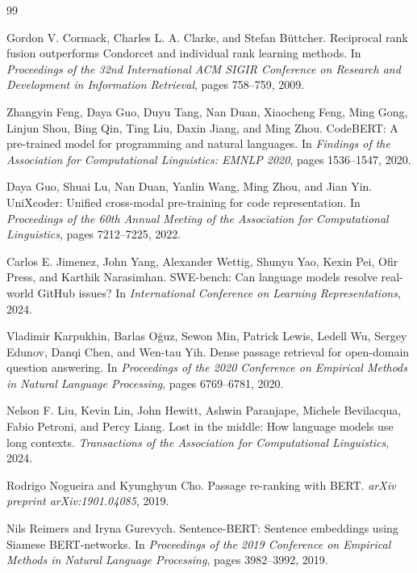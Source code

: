 \documentclass[11pt,a4paper]{article}
\begin{document}
\begin{thebibliography}{99}

Gordon V. Cormack, Charles L. A. Clarke, and Stefan B{\"u}ttcher.
\newblock Reciprocal rank fusion outperforms Condorcet and individual rank
learning methods.
\newblock In \emph{Proceedings of the 32nd International ACM SIGIR Conference
on Research and Development in Information Retrieval}, pages 758--759, 2009.

Zhangyin Feng, Daya Guo, Duyu Tang, Nan Duan, Xiaocheng Feng, Ming Gong,
Linjun Shou, Bing Qin, Ting Liu, Daxin Jiang, and Ming Zhou.
\newblock CodeBERT: A pre-trained model for programming and natural languages.
\newblock In \emph{Findings of the Association for Computational Linguistics:
EMNLP 2020}, pages 1536--1547, 2020.

Daya Guo, Shuai Lu, Nan Duan, Yanlin Wang, Ming Zhou, and Jian Yin.
\newblock UniXcoder: Unified cross-modal pre-training for code representation.
\newblock In \emph{Proceedings of the 60th Annual Meeting of the Association
for Computational Linguistics}, pages 7212--7225, 2022.

Carlos E. Jimenez, John Yang, Alexander Wettig, Shunyu Yao, Kexin Pei,
Ofir Press, and Karthik Narasimhan.
\newblock SWE-bench: Can language models resolve real-world GitHub issues?
\newblock In \emph{International Conference on Learning Representations}, 2024.

Vladimir Karpukhin, Barlas O{\u{g}}uz, Sewon Min, Patrick Lewis, Ledell Wu,
Sergey Edunov, Danqi Chen, and Wen-tau Yih.
\newblock Dense passage retrieval for open-domain question answering.
\newblock In \emph{Proceedings of the 2020 Conference on Empirical Methods in
Natural Language Processing}, pages 6769--6781, 2020.

Nelson F. Liu, Kevin Lin, John Hewitt, Ashwin Paranjape, Michele Bevilacqua,
Fabio Petroni, and Percy Liang.
\newblock Lost in the middle: How language models use long contexts.
\newblock \emph{Transactions of the Association for Computational Linguistics},
2024.

Rodrigo Nogueira and Kyunghyun Cho.
\newblock Passage re-ranking with BERT.
\newblock \emph{arXiv preprint arXiv:1901.04085}, 2019.

Nils Reimers and Iryna Gurevych.
\newblock Sentence-BERT: Sentence embeddings using Siamese BERT-networks.
\newblock In \emph{Proceedings of the 2019 Conference on Empirical Methods in
Natural Language Processing}, pages 3982--3992, 2019.


\end{thebibliography}
\end{document}
